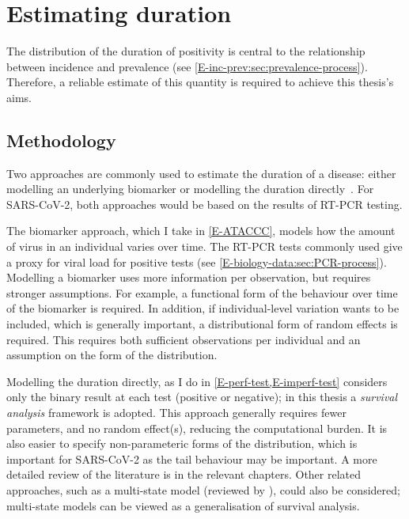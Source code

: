 \documentclass[thesis.tex]{subfiles}
\begin{document}
\section{Estimating duration} \label{intro:sec:duration}

The distribution of the duration of positivity is central to the relationship between incidence and prevalence (see \cref{E-inc-prev:sec:prevalence-process}).
Therefore, a reliable estimate of this quantity is required to achieve this thesis's aims.

\subsection{Methodology}

Two approaches are commonly used to estimate the duration of a disease: either modelling an underlying biomarker or modelling the duration directly~\autocite{sweetingEstimating}.
For SARS-CoV-2, both approaches would be based on the results of RT-PCR testing.

The biomarker approach, which I take in \cref{E-ATACCC}, models how the amount of virus in an individual varies over time.
The RT-PCR tests commonly used give a proxy for viral load for positive tests (see \cref{E-biology-data:sec:PCR-process}).
Modelling a biomarker uses more information per observation, but requires stronger assumptions.
For example, a functional form of the behaviour over time of the biomarker is required.
In addition, if individual-level variation wants to be included, which is generally important, a distributional form of random effects is required.
This requires both sufficient observations per individual and an assumption on the form of the distribution.

Modelling the duration directly, as I do in \cref{E-perf-test,E-imperf-test} considers only the binary result at each test (positive or negative); in this thesis a \emph{survival analysis} framework is adopted.
This approach generally requires fewer parameters, and no random effect(s), reducing the computational burden.
It is also easier to specify non-parameteric forms of the distribution, which is important for SARS-CoV-2 as the tail behaviour may be important.
A more detailed review of the literature is in the relevant chapters.
Other related approaches, such as a multi-state model (reviewed by \textcite{jacksonMSM}), could also be considered; multi-state models can be viewed as a generalisation of survival analysis.
\end{document}
